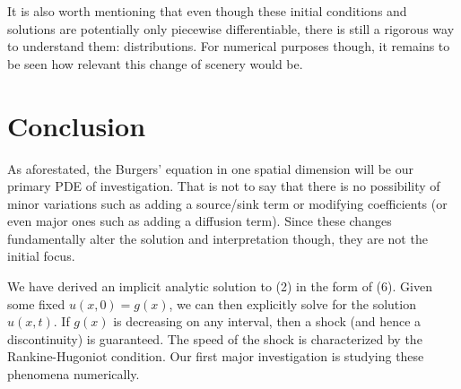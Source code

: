 \documentclass{myproject}
\begin{document}
It is also worth mentioning that even though these initial conditions and solutions are potentially only piecewise differentiable, there is still a rigorous way to understand them: distributions. For numerical purposes though, it remains to be seen how relevant this change of scenery would be.

\section{Conclusion}

As aforestated, the Burgers' equation in one spatial dimension will be our primary PDE of investigation. That is not to say that there is no possibility of minor variations such as adding a source/sink term or modifying coefficients (or even major ones such as adding a diffusion term). Since these changes fundamentally alter the solution and interpretation though, they are not the initial focus. 

We have derived an implicit analytic solution to (2) in the form of (6). Given some fixed $u(x,0) = g(x)$, we can then explicitly solve for the solution $u(x,t)$. If $g(x)$ is decreasing on any interval, then a shock (and hence a discontinuity) is guaranteed. The speed of the shock is characterized by the Rankine-Hugoniot condition. Our first major investigation is studying these phenomena numerically.

\nocite{choksi2022}
\nocite{iserles2009}
\nocite{kutz2013}
\nocite{trefethen2001}
\nocite{learncfd}
\nocite{evans2010}
\printbibliography
\end{document}
